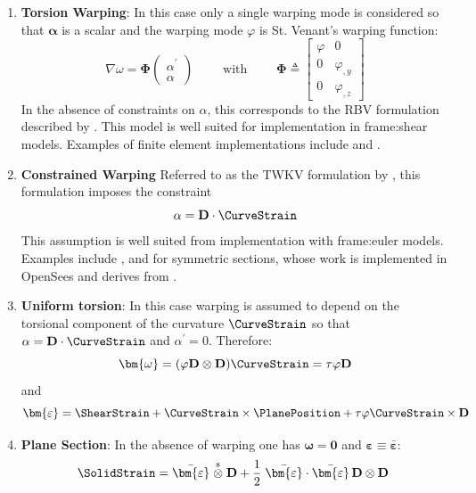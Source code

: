 \begin{enumerate}
  \item \textbf{Torsion Warping}: In this case only a single warping mode is considered so that \(\bm{\alpha}\) is a scalar and the warping mode \(\varphi\) is St. Venant's warping function:
  $$
  \nabla \omega = \bm{\Phi}\begin{pmatrix}\alpha^{\prime} \\ \alpha \end{pmatrix}
  \qquad\text{ with }\qquad
  \bm{\Phi} \triangleq \begin{bmatrix}
  \varphi & 0 \\ 0 & \varphi_{, y} \\ 0 & \varphi_{, z}
  \end{bmatrix}
  $$
  In the absence of constraints on \(\alpha\), this corresponds to the RBV formulation described by \cite{armero2021modeling}.
  This model is well suited for implementation in \gls{frame:shear} models. Examples of finite element implementations include \cite{simo1991geometricallyexact} and \cite{gruttmann2000theory}.

  \item \textbf{Constrained Warping} Referred to as the TWKV formulation by \cite{armero2021modeling}, this formulation imposes the constraint 
  \[
  \alpha = \mathbf{D} \cdot \CurveStrain
  \]
  This assumption is well suited from implementation with \gls{frame:euler} models. Examples include \cite{nukala2004mixed}, \cite[Section 3.1.2]{lecorvec2012nonlinear} and \cite{zang2011formulation} for symmetric sections, whose work is implemented in OpenSees and derives from \cite{alemdar2001distributed}.

\item \textbf{Uniform torsion}: In this case warping is assumed to depend on the torsional component of the curvature $\CurveStrain $ so that $\alpha = \mathbf{D}\cdot\CurveStrain $ and $\alpha^{\prime}=0$. Therefore:
  $$
  \bm{\omega} = (\varphi \mathbf{D}\otimes\mathbf{D})\CurveStrain  = \tau \varphi \mathbf{D}
  $$
  and
  $$
  \bm{\varepsilon} = \ShearStrain  + \CurveStrain \times\PlanePosition  + \tau\varphi \CurveStrain \times\mathbf{D}
  $$

\item \textbf{Plane Section}: In the absence of warping one has $\bm{\omega}=\bm{0}$ and $\bm{\varepsilon}\equiv \bar{\bm{\varepsilon}}$:
  $$
  \SolidStrain = \bar{\bm{\varepsilon}}
  \stackrel{\mathrm{s}}{\otimes}
  \mathbf{D} 
  + \frac{1}{2}\left.
    \bar{\bm{\varepsilon}}\cdot\bar{\bm{\varepsilon}}\,\mathbf{D}\otimes\mathbf{D}\right. \\
  $$
\end{enumerate}


